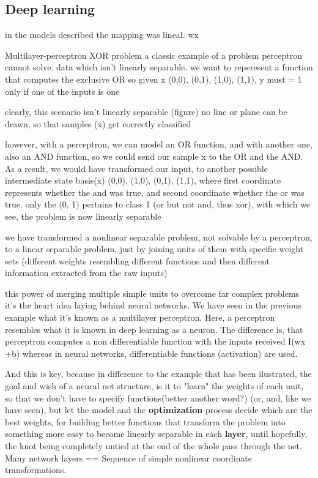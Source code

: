 \documentclass[11pt,english,listoffigures,listoftables]{tfgetsinf}
\begin{document}
\subsection{Deep learning}


in the models described the mapping was lineal. wx


Multilayer-perceptron
XOR problem
a classic example of a problem perceptron cannot solve. data which isn't linearly separable.
we want to reperesent a function that computes the exclusive OR
so given x \in (0,0), (0,1), (1,0), (1,1), y must = 1 only if one of the inputs is one

clearly, this scenario isn't linearly separable (figure)
no line or plane can be drawn, so that samples (x) get correctly classified

however, with a perceptron, we can model an OR function, and with another one, also an AND function, so we could send our sample x to the OR and the AND. As a result, we would have transformed our input, to another possible intermediate state basis(x) \in (0,0), (1,0), (0,1), (1,1), where first coordinate represents whether the and was true, and second coordinate whether the or was true.
only the (0, 1) pertains to class 1 (or but not and, thus xor), with which we see, the problem is now linearly separable

we have transformed a nonlinear separable problem, not solvable by a perceptron, to a linear separable problem, just by joining units of them with specific weight sets (different weights resembling different functions and then different information extracted from the raw inputs)

this power of merging multiple simple units to overcome far complex problems it's the heart idea laying behind neural networks. We have seen in the previous example what it's known as a multilayer perceptron. Here, a perceptron resembles what it is known in deep learning as a neuron. The difference is, that perceptron computes a non differentiable function with the inputs received I(wx +b) whereas in neural networks, differentiable functions (activation) are used.

And this is key, because in difference to the example that has been ilustrated, the goal and wish of a neural net structure, is it to "learn" the weights of each unit, so that we don't have to specify functions(better another word?) (or, and, like we have seen), but let the model and the \textbf{optimization} process decide which are the best weights, for building better functions that transform the problem into something more easy to become linearly separable in each \textbf{layer}, until hopefully, the knot being completely untied at the end of the whole pass through the net.
Many network layers == Sequence of simple nonlinear coordinate transformations.
\end{document}
